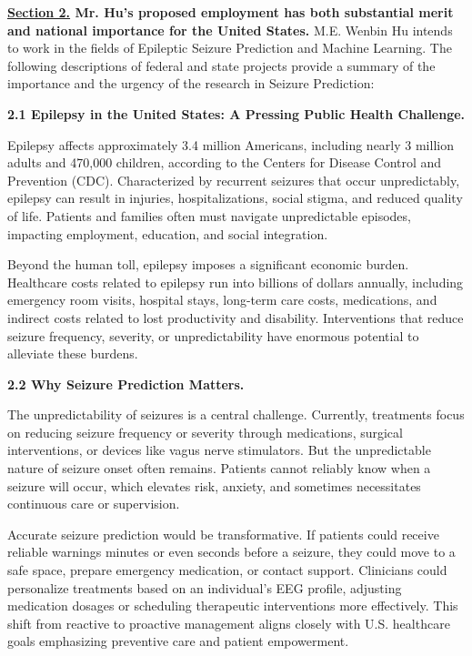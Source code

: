 \documentclass{article}
\begin{document}
\clearpage


{\bf \underline{Section 2.} Mr. Hu’s proposed employment has both substantial merit and national importance for the United States.}
M.E. Wenbin Hu intends to work in the fields of Epileptic Seizure Prediction and Machine Learning. The following descriptions of federal and state projects provide a summary of the importance and the urgency of the research in  Seizure Prediction:

{\bf 2.1 Epilepsy in the United States: A Pressing Public Health Challenge. }

Epilepsy affects approximately 3.4 million Americans, including nearly 3 million adults and 470,000 children, according to the Centers for Disease Control and Prevention (CDC). Characterized by recurrent seizures that occur unpredictably, epilepsy can result in injuries, hospitalizations, social stigma, and reduced quality of life. Patients and families often must navigate unpredictable episodes, impacting employment, education, and social integration.

Beyond the human toll, epilepsy imposes a significant economic burden. Healthcare costs related to epilepsy run into billions of dollars annually, including emergency room visits, hospital stays, long-term care costs, medications, and indirect costs related to lost productivity and disability. Interventions that reduce seizure frequency, severity, or unpredictability have enormous potential to alleviate these burdens.


{\bf 2.2 Why Seizure Prediction Matters. }

The unpredictability of seizures is a central challenge. Currently, treatments focus on reducing seizure frequency or severity through medications, surgical interventions, or devices like vagus nerve stimulators. But the unpredictable nature of seizure onset often remains. Patients cannot reliably know when a seizure will occur, which elevates risk, anxiety, and sometimes necessitates continuous care or supervision.

Accurate seizure prediction would be transformative. If patients could receive reliable warnings minutes or even seconds before a seizure, they could move to a safe space, prepare emergency medication, or contact support. Clinicians could personalize treatments based on an individual’s EEG profile, adjusting medication dosages or scheduling therapeutic interventions more effectively. This shift from reactive to proactive management aligns closely with U.S. healthcare goals emphasizing preventive care and patient empowerment.
\end{document}
